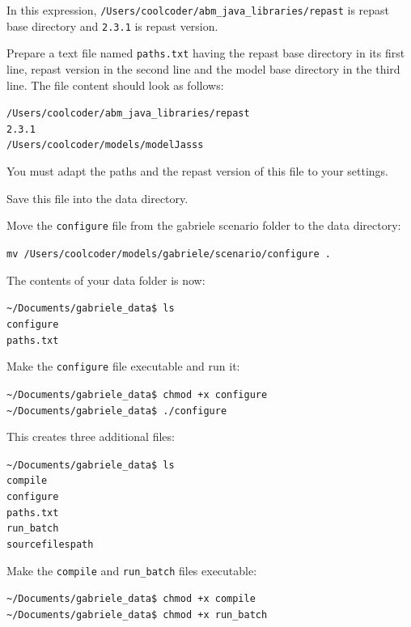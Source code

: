 \documentclass{book}
\begin{document}
In this expression, \verb+/Users/coolcoder/abm_java_libraries/repast+ is repast base directory and \verb+2.3.1+ is repast version.

Prepare a text file named \verb+paths.txt+ having the repast base directory in its first line, repast version in the second line and the model base directory in the third line. The file content should look as follows:

\color{magenta}
\vskip2mm \noindent
\verb+/Users/coolcoder/abm_java_libraries/repast+ \\
\verb+2.3.1+ \\
\verb+/Users/coolcoder/models/modelJasss+
\vskip2mm

\color{black}
You must adapt the paths and the repast version of this file to your settings.

Save this file into the data directory.

Move the \verb+configure+ file from the gabriele scenario folder to the data directory:

\verb+mv /Users/coolcoder/models/gabriele/scenario/configure . +


The contents of your data folder is now:

\vskip2mm
\noindent\verb+~/Documents/gabriele_data$ +\color{red}\verb+ls+ \color{blue}\\
\verb+configure+ \\
\verb+paths.txt+
\color{black}

\vskip2mm
Make the \verb+configure+ file executable and run it:

\vskip2mm
\noindent\verb+~/Documents/gabriele_data$ +\color{red}\verb|chmod +x configure| \color{black}\\
\verb+~/Documents/gabriele_data$ +\color{red}\verb|./configure| \color{black}

\vskip2mm
This creates three additional files:

\vskip2mm
\noindent\verb+~/Documents/gabriele_data$ +\color{red}\verb+ls+ \color{blue}\\
\verb+compile+\\ \color{green}
\verb+configure+\\ \color{blue}
\verb+paths.txt+ \\
\verb+run_batch+ \\
\verb+sourcefilespath+
\color{black}

\vskip2mm
Make the \verb+compile+ and \verb+run_batch+ files executable:

\vskip2mm
\noindent\verb+~/Documents/gabriele_data$ +\color{red}\verb|chmod +x compile| \color{black}\\
\verb+~/Documents/gabriele_data$ +\color{red}\verb|chmod +x run_batch| \color{black}
\vskip2mm
\end{document}
